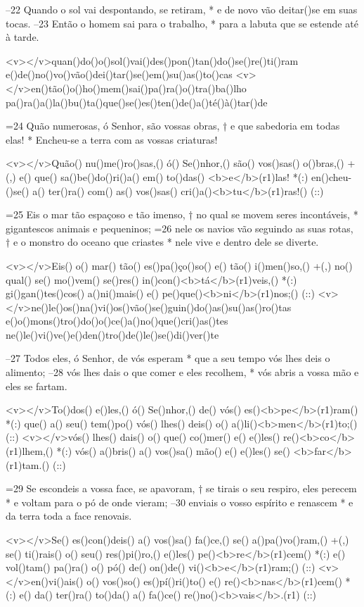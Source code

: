 –22 Quando o sol vai despontando, se retiram, *
e de novo vão deitar()se em suas tocas.
–23 Então o homem sai para o trabalho, *
para a labuta que se estende até à tarde.

<v></v>quan()do()o()sol()vai()des()pon()tan()do()se()re()ti()ram
e()de()no()vo()vão()dei()tar()se()em()su()as()to()cas
<v></v>en()tão()o()ho()mem()sai()pa()ra()o()tra()ba()lho
pa()ra()a()la()bu()ta()que()se()es()ten()de()a()té()à()tar()de

=24 Quão numerosas, ó Senhor, são vossas obras, †
e que sabedoria em todas elas! *
Encheu-se a terra com as vossas criaturas!

<v></v>Quão() nu()me()ro()sas,() ó() Se()nhor,() são() vos()sas() o()bras,() +(,)
e() que() sa()be()do()ri()a() em() to()das() <b>e</b>(r1)las! *(:)
en()cheu-()se() a() ter()ra() com() as() vos()sas() cri()a()<b>tu</b>(r1)ras!() (::)

=25 Eis o mar tão espaçoso e tão imenso, †
no qual se movem seres incontáveis, *
gigantescos animais e pequeninos;
=26 nele os navios vão seguindo as suas rotas, †
e o monstro do oceano que criastes *
nele vive e dentro dele se diverte.

<v></v>Eis() o() mar() tão() es()pa()ço()so() e() tão() i()men()so,() +(,)
no() qual() se() mo()vem() se()res() in()con()<b>tá</b>(r1)veis,() *(:)
gi()gan()tes()cos() a()ni()mais() e() pe()que()<b>ni</b>(r1)nos;() (::)
<v></v>ne()le()os()na()vi()os()vão()se()guin()do()as()su()as()ro()tas
e()o()mons()tro()do()o()ce()a()no()que()cri()as()tes
ne()le()vi()ve()e()den()tro()de()le()se()di()ver()te

–27 Todos eles, ó Senhor, de vós esperam *
que a seu tempo vós lhes deis o alimento;
–28 vós lhes dais o que comer e eles recolhem, *
vós abris a vossa mão e eles se fartam.

<v></v>To()dos() e()les,() ó() Se()nhor,() de() vós() es()<b>pe</b>(r1)ram() *(:)
que() a() seu() tem()po() vós() lhes() deis() o() a()li()<b>men</b>(r1)to;() (::)
<v></v>vós() lhes() dais() o() que() co()mer() e() e()les() re()<b>co</b>(r1)lhem,() *(:)
vós() a()bris() a() vos()sa() mão() e() e()les() se() <b>far</b>(r1)tam.() (::)

=29 Se escondeis a vossa face, se apavoram, †
se tirais o seu respiro, eles perecem *
e voltam para o pó de onde vieram;
–30 enviais o vosso espírito e renascem *
e da terra toda a face renovais.

<v></v>Se() es()con()deis() a() vos()sa() fa()ce,() se() a()pa()vo()ram,() +(,)
se() ti()rais() o() seu() res()pi()ro,() e()les() pe()<b>re</b>(r1)cem() *(:)
e() vol()tam() pa()ra() o() pó() de() on()de() vi()<b>e</b>(r1)ram;() (::)
<v></v>en()vi()ais() o() vos()so() es()pí()ri()to() e() re()<b>nas</b>(r1)cem() *(:)
e() da() ter()ra() to()da() a() fa()ce() re()no()<b>vais</b>.(r1) (::)


